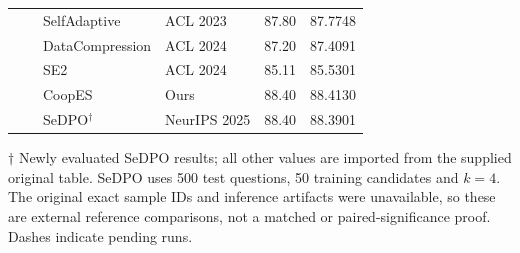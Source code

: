 \begin{table}[t]
\begin{tabular}{llllrr}
 &  & SelfAdaptive & ACL 2023 & 87.80 & 87.7748 \\
 &  & DataCompression & ACL 2024 & 87.20 & 87.4091 \\
 &  & SE2 & ACL 2024 & 85.11 & 85.5301 \\
 &  & CoopES & Ours & 88.40 & 88.4130 \\
 & & SeDPO$^{\dagger}$ & NeurIPS 2025 & 88.40 & 88.3901 \\
\bottomrule
\end{tabular}
\vspace{3pt}
\begin{minipage}{0.98\textwidth}\footnotesize
$\dagger$ Newly evaluated SeDPO results; all other values are imported from the supplied original table. SeDPO uses 500 test questions, 50 training candidates and $k=4$. The original exact sample IDs and inference artifacts were unavailable, so these are external reference comparisons, not a matched or paired-significance proof. Dashes indicate pending runs.
\end{minipage}
\end{table}

